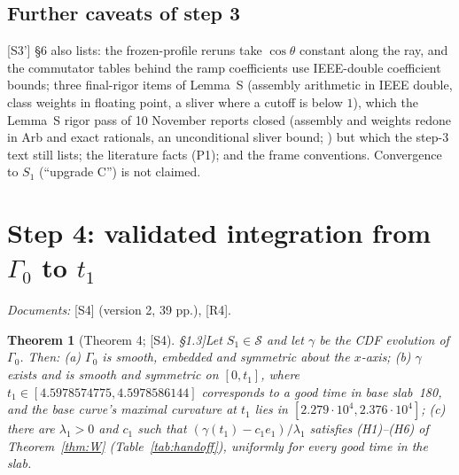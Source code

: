 \documentclass[11pt]{amsart}
\newtheorem{theorem}{Theorem}[section]
\theoremstyle{definition}
\theoremstyle{remark}
\newcommand{\fn}[1]{\texttt{\detokenize{#1}}}
\newcommand{\dref}[1]{[\textsf{#1}]}
\newcommand{\Sset}{\mathcal S}
\begin{document}
\subsection{Further caveats of step 3}\label{ss:caveats}
\dref{S3'} \S6 also lists: the frozen-profile reruns take $\cos\theta$ constant along the ray, and the commutator tables behind the ramp coefficients use IEEE-double coefficient bounds; three final-rigor items of Lemma~S (assembly arithmetic in IEEE double, class weights in floating point, a sliver where a cutoff is below $1$), which the Lemma~S rigor pass of 10 November reports closed (assembly and weights redone in Arb and exact rationals, an unconditional sliver bound; \fn{lemmaS/rigor/RIGOR_PASS.md}) but which the step-3 text still lists; the literature facts (P1); and the frame conventions. Convergence to $S_1$ (``upgrade C'') is not claimed.

\section{Step 4: validated integration from \texorpdfstring{$\Gamma_0$}{Gamma0} to \texorpdfstring{$t_1$}{t1}}\label{s:step4}
\emph{Documents:} \dref{S4} (version 2, 39 pp.), \dref{R4}.

\begin{theorem}[Theorem 4; \dref{S4} \S1.3]\label{thm:4}
Let $S_1\in\Sset$ and let $\gamma$ be the CDF evolution of $\Gamma_0$. Then: (a) $\Gamma_0$ is smooth, embedded and symmetric about the $x$-axis; (b) $\gamma$ exists and is smooth and symmetric on $[0,t_1]$, where $t_1\in[4.5978574775,4.5978586144]$ corresponds to a good time in base slab~180, and the base curve's maximal curvature at $t_1$ lies in $[2.279\cdot10^4,2.376\cdot10^4]$; (c) there are $\lambda_1>0$ and $c_1$ such that $(\gamma(t_1)-c_1e_1)/\lambda_1$ satisfies (H1)--(H6) of Theorem~\ref{thm:W} (Table~\ref{tab:handoff}), uniformly for every good time in the slab.
\end{theorem}
\end{document}

